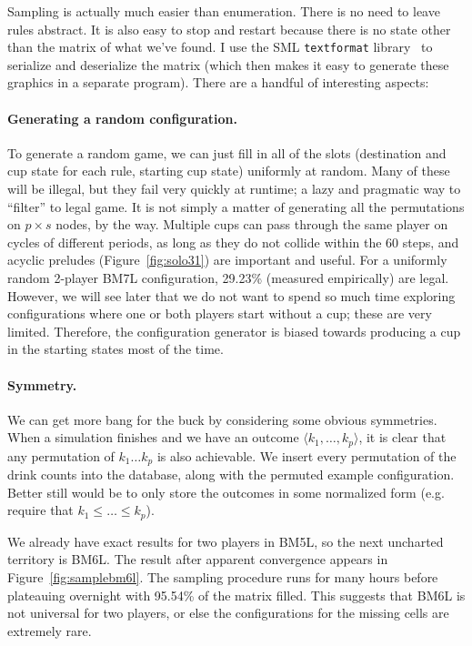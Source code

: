 \documentclass[twocolumn]{article}
\begin{document}
Sampling is actually much easier than enumeration. There is no need to
leave rules abstract. It is also easy to stop and restart because
there is no state other than the matrix of what we've found. I use the
SML {\tt textformat} library~\cite{textformat} to serialize and
deserialize the matrix (which then makes it easy to generate these
graphics in a separate program). There are a handful of interesting
aspects:

\paragraph{Generating a random configuration.} To generate a random
game, we can just fill in all of the slots (destination and cup state
for each rule, starting cup state) uniformly at random. Many of these
will be illegal, but they fail very quickly at runtime; a lazy and
pragmatic way to ``filter'' to legal game. It is not simply a matter
of generating all the permutations on $p \times s$ nodes, by the way.
Multiple cups can pass through the same player on cycles of different
periods, as long as they do not collide within the 60 steps, and
acyclic preludes (Figure~\ref{fig:solo31}) are important and useful.
For a uniformly random 2-player BM7L configuration, 29.23\% (measured
empirically) are legal. However, we will see later that we do not want
to spend so much time exploring configurations where one or both
players start without a cup; these are very limited. Therefore, the
configuration generator is biased towards producing a cup in the
starting states most of the time.

\paragraph{Symmetry.} We can get more bang for the buck by considering
some obvious symmetries. When a simulation finishes and we have an
outcome $\langle k_1, \ldots, k_p \rangle$, it is clear that any
permutation of $k_1 \ldots k_p$ is also achievable. We insert every
permutation of the drink counts into the database, along with the
permuted example configuration. Better still would be to only store
the outcomes in some normalized form (e.g. require that $k_1 \leq
\ldots \leq k_p$).

We already have exact results for two players in BM5L, so the next
uncharted territory is BM6L. The result after apparent convergence
appears in Figure~\ref{fig:samplebm6l}. The sampling procedure runs
for many hours before plateauing overnight with 95.54\% of the matrix
filled. This suggests that BM6L is not universal for two players, or
else the configurations for the missing cells are extremely rare.
\end{document}

